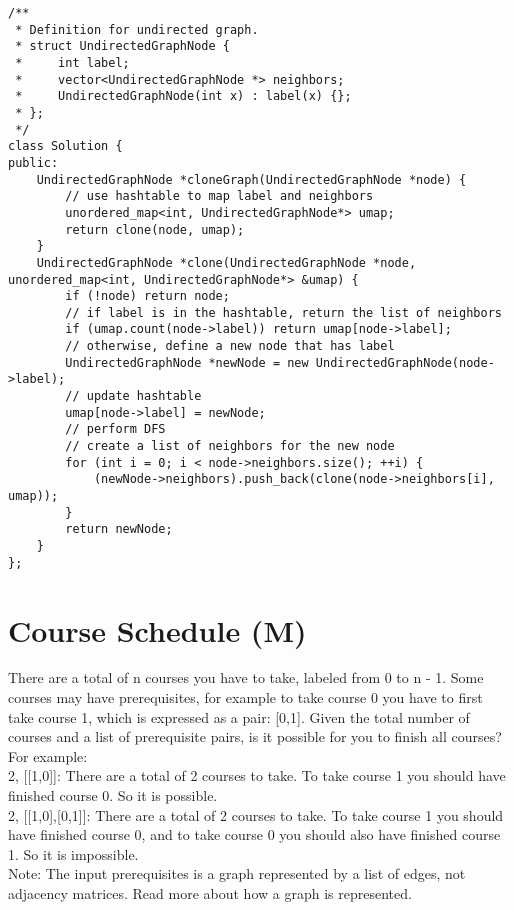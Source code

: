 \begin{lstlisting}
/**
 * Definition for undirected graph.
 * struct UndirectedGraphNode {
 *     int label;
 *     vector<UndirectedGraphNode *> neighbors;
 *     UndirectedGraphNode(int x) : label(x) {};
 * };
 */
class Solution {
public:
    UndirectedGraphNode *cloneGraph(UndirectedGraphNode *node) {
        // use hashtable to map label and neighbors
        unordered_map<int, UndirectedGraphNode*> umap;
        return clone(node, umap);
    }
    UndirectedGraphNode *clone(UndirectedGraphNode *node, unordered_map<int, UndirectedGraphNode*> &umap) {
        if (!node) return node;
        // if label is in the hashtable, return the list of neighbors
        if (umap.count(node->label)) return umap[node->label];
        // otherwise, define a new node that has label
        UndirectedGraphNode *newNode = new UndirectedGraphNode(node->label);
        // update hashtable
        umap[node->label] = newNode;
        // perform DFS
        // create a list of neighbors for the new node
        for (int i = 0; i < node->neighbors.size(); ++i) {
            (newNode->neighbors).push_back(clone(node->neighbors[i], umap));
        }
        return newNode;
    } 
};
\end{lstlisting}


\section{Course Schedule (M)}
There are a total of n courses you have to take, labeled from 0 to n - 1. Some courses may have prerequisites, for example to take course 0 you have to first take course 1, which is expressed as a pair: [0,1]. Given the total number of courses and a list of prerequisite pairs, is it possible for you to finish all courses? \\

For example:\\
2, [[1,0]]: There are a total of 2 courses to take. To take course 1 you should have finished course 0. So it is possible.\\
2, [[1,0],[0,1]]: There are a total of 2 courses to take. To take course 1 you should have finished course 0, and to take course 0 you should also have finished course 1. So it is impossible.\\

Note:
The input prerequisites is a graph represented by a list of edges, not adjacency matrices. Read more about how a graph is represented.\\

